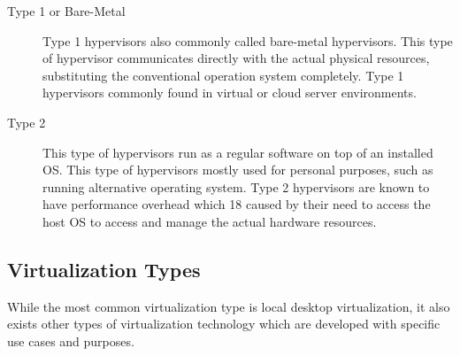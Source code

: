 \documentclass[../index.tex]{subfiles}
\begin{document}
\begin{description}

  \item[Type 1 or Bare-Metal] Type 1 hypervisors also commonly called bare-metal hypervisors. This
    type of hypervisor communicates directly with the actual physical resources, substituting the
    conventional operation system completely. Type 1 hypervisors commonly found in virtual or cloud
    server environments.

  \item[Type 2] This type of hypervisors run as a regular software on top of an installed OS. This
    type of hypervisors mostly used for personal purposes, such as running alternative operating
    system. Type 2 hypervisors are known to have performance overhead which 18 caused by their need
    to access the host OS to access and manage the actual hardware resources.

\end{description}

\subsection{Virtualization Types}

While the most common virtualization type is local desktop virtualization, it also exists other
types of virtualization technology which are developed with specific use cases and purposes.
\end{document}
